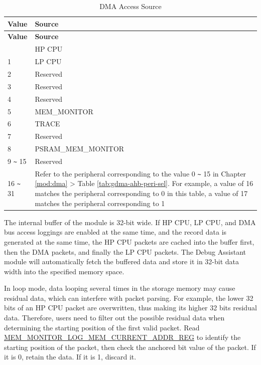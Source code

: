 \documentclass[main\_\_EN.tex]{subfiles}
\begin{document}
\begin{longtable}{|l| m{8cm} |}
    \caption{DMA Access Source}\label{tab:assistdbg-dma-source}
    \\\hline
    \rowcolor{lightgray}
    \textbf{Value} & \textbf{Source} \\\hline
    \endfirsthead \hline \rowcolor{lightgray}
    \textbf{Value} & \textbf{Source} \\\hline
    \endhead \endfoot \hline \endlastfoot
    0 & HP CPU \\\hline
    1 & LP CPU \\\hline
    2 & Reserved \\\hline
    3 & Reserved \\\hline
    4 & Reserved \\\hline
    5 & MEM\_MONITOR \\\hline
    6 & TRACE \\\hline 
    7 & Reserved \\\hline
    8 & PSRAM\_MEM\_MONITOR \\\hline
    9 \verb+~+ 15 & Reserved \\\hline
    16 \verb+~+ 31 & Refer to the peripheral corresponding to the value 0 \verb+~+ 15 in Chapter \ref{mod:dma} \textit{\nameref{mod:dma}} > Table \ref{tab:gdma-ahb-peri-sel}. For example, a value of 16 matches the peripheral corresponding to 0 in this table, a value of 17 matches the peripheral corresponding to 1 \\\hline
\end{longtable}

The internal buffer of the module is 32-bit wide. If HP CPU, LP CPU, and DMA bus access loggings are enabled at the same time, and the record data is generated at the same time, the HP CPU packets are cached into the buffer first, then the DMA packets, and finally the LP CPU packets. The Debug Assistant module will automatically fetch the buffered data and store it in 32-bit data width into the specified memory space.

In loop mode, data looping several times in the storage memory may cause residual data, which can interfere with packet parsing. For example, the lower 32 bits of an HP CPU packet are overwritten, thus making its higher 32 bits residual data. Therefore, users need to filter out the possible residual data when determining the starting position of the first valid packet. Read \hyperref[regdesc:MEMMONITORLOGMEMCURRENTADDRREG]{MEM\_MONITOR\_LOG\_MEM\_CURRENT\_ADDR\_REG} to identify the starting position of the packet, then check the anchored bit value of the packet. If it is 0, retain the data. If it is 1, discard it. 
\end{document}
